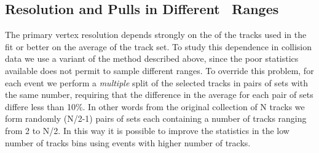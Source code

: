 \subsection{Resolution and Pulls in Different \pt\, Ranges}
\label{sub:mpt}

The primary vertex resolution depends strongly on the \pt of the tracks used in the fit or better on the average \pt of the track set. To study this dependence in collision data we use a variant of the method described above, since the poor statistics available does not permit to sample different \pt ranges. To override this problem, for each event we perform a \emph{multiple} split of the selected tracks in pairs of sets with the same number, requiring that the difference in the average \pt for each pair of sets differe less than 10\%. In other words from the original collection of N tracks we form randomly (N/2-1) pairs of sets each containing a number of tracks ranging from 2 to N/2. In this way it is possible to improve the statistics in the low number of tracks bins using events with higher number of tracks. 
